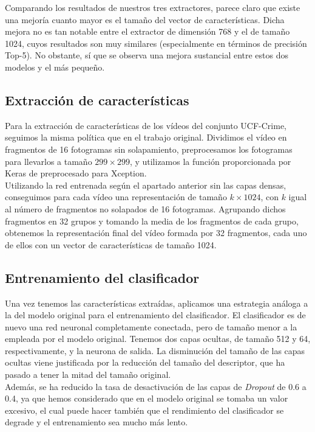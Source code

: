 \documentclass[../main.tex]{memoir}
\begin{document}
Comparando los resultados de nuestros tres extractores, parece claro
que existe una mejoría cuanto mayor es el tamaño del vector de
características. Dicha mejora no es tan notable entre el extractor de
dimensión 768 y el de tamaño 1024, cuyos resultados son muy similares
(especialmente en términos de precisión Top-5). No obstante, sí que
se observa una mejora sustancial entre estos dos modelos y el más
pequeño.

\subsection{Extracción de características}

Para la extracción de características de los vídeos del conjunto
UCF-Crime, seguimos la misma política que en el trabajo original.
Dividimos el vídeo en fragmentos de 16 fotogramas sin solapamiento,
preprocesamos los fotogramas para llevarlos a tamaño $299 \times 299$,
y utilizamos la función proporcionada por Keras de preprocesado
para Xception.\\

Utilizando la red entrenada según el apartado anterior sin las capas
densas, conseguimos para cada vídeo una representación de tamaño
$k \times 1024$, con $k$ igual al número de fragmentos no solapados de
16 fotogramas. Agrupando dichos fragmentos en 32 grupos y tomando la
media de los fragmentos de cada grupo, obtenemos la representación
final del vídeo formada por 32 fragmentos, cada uno de ellos con un
vector de características de tamaño 1024.

\subsection{Entrenamiento del clasificador}

Una vez tenemos las características extraídas, aplicamos una
estrategia análoga a la del modelo original para el entrenamiento del
clasificador. El clasificador es de nuevo una red neuronal
completamente conectada, pero de tamaño menor a la empleada por el
modelo original. Tenemos dos capas ocultas, de tamaño 512 y 64,
respectivamente, y la neurona de salida. La disminución del tamaño de
las capas ocultas viene justificada por la reducción del tamaño del
descriptor, que ha pasado a tener la mitad del tamaño original.\\

Además, se ha reducido la tasa de desactivación de las capas de
\textit{Dropout} de 0.6 a 0.4, ya que hemos considerado que en el
modelo original se tomaba un valor excesivo, el cual puede hacer
también que el rendimiento del clasificador se degrade y el
entrenamiento sea mucho más lento.\\
\end{document}

